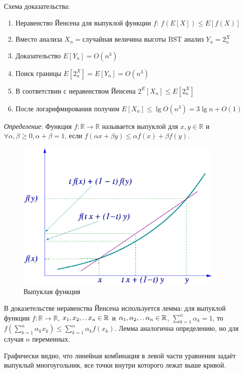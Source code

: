 \documentclass[11pt]{article}
\begin{document}
Схема доказательства:
\begin{enumerate}
\item Неравенство Йенсена для выпуклой функции $f$: $f(E[X]) \leqslant E[f(X)]$
\item Вместо анализа $X_n = \text{случайная величина высоты BST}$ анализ $Y_n = 2^X_n$
\item Доказательство $E[Y_n] = O(n^3)$
\item Поиск границы $E[2^X_n] = E[Y_n] = O(n^3)$
\item В соответствии с неравенством Йенсена $2^E[X_n] \leqslant E[2^X_n]$
\item После логарифмирования получим $E[X_n] \leqslant \lg O(n^3) = 3\lg n + O(1)$
\end{enumerate}

\emph{Определение}: Функция $f \colon \mathbb{R}\to\mathbb{R}$ называется выпуклой для $x, y \in \mathbb{R}$ и $\forall \alpha, \beta \geqslant 0, \alpha+\beta=1$, если $f(\alpha x + \beta y) \leqslant \alpha f(x) + \beta f(y)$.
\begin{figure}[ht]
  \centering
  \includegraphics[width=4in]{lecture9/convex.eps}
  \caption{Выпуклая функция}
  \label{fig:convex}
\end{figure}

В доказетельстве неравенства Йенсена используется лемма: для выпуклой функции $f \colon \mathbb{R}\to\mathbb{R}$, $x_1, x_2, \mathinner{\ldotp\ldotp} x_n \in \mathbb{R}$ и $\alpha_1, \alpha_2, \mathinner{\ldotp\ldotp} \alpha_n \in \mathbb{R}$, $\sum_{k=1}^{n}\alpha_k = 1$, то $f(\sum_{k=1}^{n} \alpha_k x_k) \leqslant \sum_{k=1}^{n} \alpha_k f(x_k)$. Лемма аналогична определению, но для случая $n$ переменных.

Графически видно, что линейная комбинация в левой части уравнения задаёт выпуклый многоугольник, все точки внутри которого лежат выше кривой.
\end{document}
